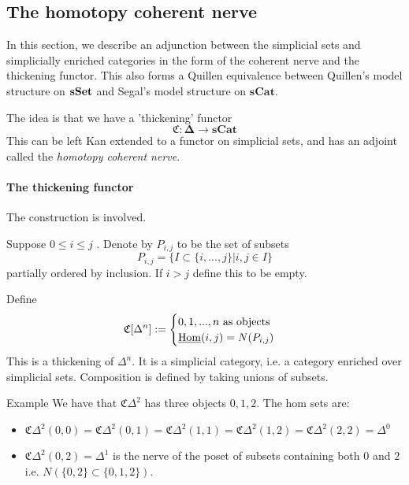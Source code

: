 \subsection{The homotopy coherent nerve}
In this section, we describe an adjunction between the simplicial sets and simplicially enriched categories in the form of the coherent nerve and the thickening functor. This also forms a Quillen equivalence between Quillen's model structure on $\operatorname{\mathbf{sSet}}$ and Segal's model structure on $\mathbf{sCat}$.

The idea is that we have a 'thickening' functor $$\mathfrak{C}:\mathbf{\Delta}\rightarrow \mathbf{sCat}$$
This can be left Kan extended to a functor on simplicial sets, and has an adjoint called the \emph{homotopy coherent nerve}.

\paragraph*{The thickening functor}

The construction is involved.

Suppose $0\leq i\leq j$ . Denote by $P_{i,j}$ to be the set of subsets $$P_{i,j}=\{I\subset \{i,...,j\}| i,j\in I\}$$partially ordered by inclusion. If $i>j$ define this to be empty. 

Define $$\mathfrak{C}[\Delta^n]:=\begin{cases}0,1,...,n \text{ as objects}\\\underline{\operatorname{Hom}}(i,j)=N(P_{i,j}) \end{cases}$$This is a thickening of $\Delta^n$. It is a simplicial category, i.e. a category enriched over simplicial sets. Composition is defined by taking unions of subsets. 

\begin{example}{Example}{}
    We have that $\mathfrak{C}\Delta^2$ has three objects $0,1,2$. The hom sets are: \begin{itemize}
        \item $\mathfrak{C}\Delta^2(0,0)=\mathfrak{C}\Delta^2(0,1)=\mathfrak{C}\Delta^2(1,1)=\mathfrak{C}\Delta^2(1,2)=\mathfrak{C}\Delta^2(2,2)=\Delta^0$
        \item $\mathfrak{C}\Delta^2(0,2)=\Delta^1$ is the nerve of the poset of subsets containing both $0$ and $2$ i.e. $N(\{0,2\}\subset \{0,1,2\})$. 
    \end{itemize}
    
\end{example}

